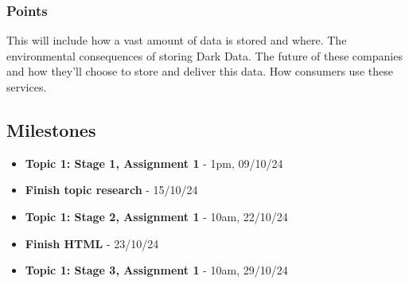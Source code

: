 \documentclass{article}
\begin{document}
        \subsubsection{Points}
        This will include how a vast amount of data is stored and where. 
        The environmental consequences of storing Dark Data.
        The future of these companies and how they'll choose to store and deliver this data.
        How consumers use these services.

        

\subsection{Milestones}
    \begin{itemize}
        \item \textbf{Topic 1: Stage 1, Assignment 1} - 1pm, 09/10/24
        \item \textbf{Finish topic research} - 15/10/24
        \item \textbf{Topic 1: Stage 2, Assignment 1} - 10am, 22/10/24
        \item \textbf{Finish HTML} - 23/10/24
        \item \textbf{Topic 1: Stage 3, Assignment 1} - 10am, 29/10/24
    \end{itemize}
\end{document}
